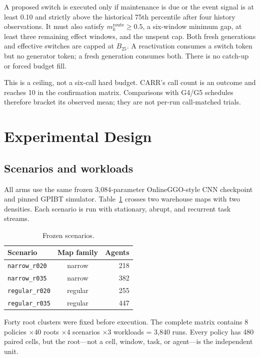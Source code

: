 \documentclass[sigconf,anonymous,review]{acmart}
\newcommand{\carr}{\textsc{CARR}}
\begin{document}
A proposed switch is executed only if maintenance is due or the event signal
is at least 0.10 and strictly above the historical 75th percentile after four
history observations. It must also satisfy
$m_k^{\mathrm{route}}\geq0.5$, a six-window minimum gap, at least three
remaining effect windows, and the unspent cap. Both fresh generations and
effective switches are capped at $B_{25}$. A reactivation consumes a switch
token but no generator token; a fresh generation consumes both. There is no
catch-up or forced budget fill.

This is a ceiling, not a six-call hard budget. \carr's call count is an outcome
and reaches 10 in the confirmation matrix. Comparisons with G4/G5 schedules
therefore bracket its observed mean; they are not per-run call-matched trials.

\section{Experimental Design}

\subsection{Scenarios and workloads}

All arms use the same frozen 3,084-parameter OnlineGGO-style CNN checkpoint
and pinned GPIBT simulator. Table~\ref{tab:scenarios} crosses two warehouse
maps with two densities. Each scenario is run with stationary, abrupt, and
recurrent task streams.

\begin{table}[t]
\caption{Frozen scenarios.}
\label{tab:scenarios}
\centering
\small
\begin{tabular}{lcr}
\toprule
Scenario & Map family & Agents \\
\midrule
\texttt{narrow\_r020}  & narrow  & 218 \\
\texttt{narrow\_r035}  & narrow  & 382 \\
\texttt{regular\_r020} & regular & 255 \\
\texttt{regular\_r035} & regular & 447 \\
\bottomrule
\end{tabular}
\end{table}

Forty root clusters were fixed before execution. The complete matrix contains
$8$ policies $\times40$ roots $\times4$ scenarios $\times3$ workloads = 3{,}840
runs. Every policy has 480 paired cells, but the root---not a cell, window,
task, or agent---is the independent unit.
\end{document}
